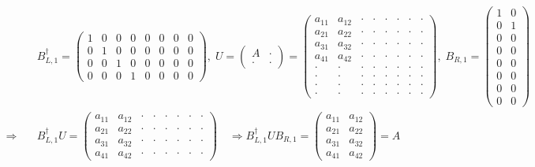 \documentclass[a4paper,atbegshi,chapter,]{oblivoir}
\begin{document}
\begin{align*}
  &B^{\dagger}_{L,1} =
    \begin{pmatrix}
      1&0&0&0&0&0&0&0\\0&1&0&0&0&0&0&0\\0&0&1&0&0&0&0&0\\0&0&0&1&0&0&0&0
  \end{pmatrix},\;
  U = \begin{pmatrix}A&\cdot\\\cdot&\cdot\end{pmatrix} =
  \begin{pmatrix}
    a_{11}&a_{12}&\cdot&\cdot&\cdot&\cdot&\cdot&\cdot\\
    a_{21}&a_{22}&\cdot&\cdot&\cdot&\cdot&\cdot&\cdot\\
    a_{31}&a_{32}&\cdot&\cdot&\cdot&\cdot&\cdot&\cdot\\
    a_{41}&a_{42}&\cdot&\cdot&\cdot&\cdot&\cdot&\cdot\\
    \cdot&\cdot&\cdot&\cdot&\cdot&\cdot&\cdot&\cdot\\
    \cdot&\cdot&\cdot&\cdot&\cdot&\cdot&\cdot&\cdot\\
    \cdot&\cdot&\cdot&\cdot&\cdot&\cdot&\cdot&\cdot\\
    \cdot&\cdot&\cdot&\cdot&\cdot&\cdot&\cdot&\cdot
  \end{pmatrix},\;
    B_{R,1} =  \begin{pmatrix}
    1&0\\0&1\\0&0\\0&0\\0&0\\0&0\\0&0\\0&0
  \end{pmatrix}\\
  \Rightarrow\quad&B_{L,1}^{\dagger}U = 
  \begin{pmatrix}
    a_{11}&a_{12}&\cdot&\cdot&\cdot&\cdot&\cdot&\cdot\\
    a_{21}&a_{22}&\cdot&\cdot&\cdot&\cdot&\cdot&\cdot\\
    a_{31}&a_{32}&\cdot&\cdot&\cdot&\cdot&\cdot&\cdot\\
    a_{41}&a_{42}&\cdot&\cdot&\cdot&\cdot&\cdot&\cdot
  \end{pmatrix} \quad\Longrightarrow
  B_{L,1}^{\dagger}UB_{R,1} =
  \begin{pmatrix}
    a_{11}&a_{12}\\a_{21}&a_{22}\\a_{31}&a_{32}\\a_{41}&a_{42}
  \end{pmatrix}
  = A
\end{align*}
\end{document}
